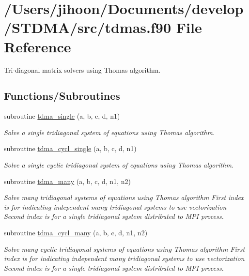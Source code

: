 \hypertarget{tdmas_8f90}{}\section{/\+Users/jihoon/\+Documents/develop/\+S\+T\+D\+M\+A/src/tdmas.f90 File Reference}
\label{tdmas_8f90}


Tri-\/diagonal matrix solvers using Thomas algorithm.  


\subsection*{Functions/\+Subroutines}
\begin{DoxyCompactItemize}
\item 
subroutine \mbox{\hyperlink{tdmas_8f90_a4a6130fff49607012fefacc8640424a7}{tdma\+\_\+single}} (a, b, c, d, n1)
\begin{DoxyCompactList}\small\item\em Solve a single tridiagonal system of equations using Thomas algorithm. \end{DoxyCompactList}\item 
subroutine \mbox{\hyperlink{tdmas_8f90_a4cb1f95e9c608085c5bb19baff639d9e}{tdma\+\_\+cycl\+\_\+single}} (a, b, c, d, n1)
\begin{DoxyCompactList}\small\item\em Solve a single cyclic tridiagonal system of equations using Thomas algorithm. \end{DoxyCompactList}\item 
subroutine \mbox{\hyperlink{tdmas_8f90_ab8cc761496e63e21ee8379d4fc077f05}{tdma\+\_\+many}} (a, b, c, d, n1, n2)
\begin{DoxyCompactList}\small\item\em Solve many tridiagonal systems of equations using Thomas algorithm First index is for indicating independent many tridiagonal systems to use vectorization Second index is for a single tridiagonal system distributed to M\+PI process. \end{DoxyCompactList}\item 
subroutine \mbox{\hyperlink{tdmas_8f90_a6c50d548eaa4b5e9b96ccbf8f65cb12a}{tdma\+\_\+cycl\+\_\+many}} (a, b, c, d, n1, n2)
\begin{DoxyCompactList}\small\item\em Solve many cyclic tridiagonal systems of equations using Thomas algorithm First index is for indicating independent many tridiagonal systems to use vectorization Second index is for a single tridiagonal system distributed to M\+PI process. \end{DoxyCompactList}\end{DoxyCompactItemize}


